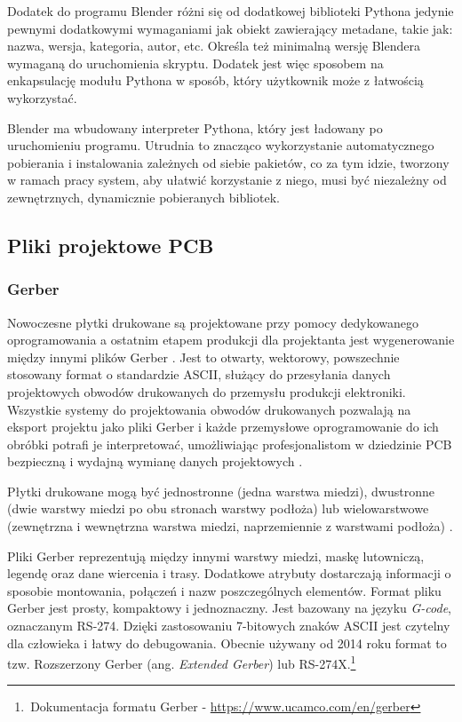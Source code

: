 \documentclass[brudnopis]{xmgr}
\begin{document}
Dodatek do programu Blender różni się od dodatkowej biblioteki Pythona jedynie pewnymi dodatkowymi wymaganiami jak obiekt zawierający metadane, takie jak: nazwa, wersja, kategoria, autor, etc. Określa też minimalną wersję Blendera wymaganą do uruchomienia skryptu. Dodatek jest więc sposobem na enkapsulację modułu Pythona w sposób, który użytkownik może z łatwością wykorzystać.

Blender ma wbudowany interpreter Pythona, który jest ładowany po uruchomieniu programu. Utrudnia to znacząco wykorzystanie automatycznego pobierania i instalowania zależnych od siebie pakietów, co za tym idzie, tworzony w ramach pracy system, aby ułatwić korzystanie z niego, musi być niezależny od zewnętrznych, dynamicznie pobieranych bibliotek.


\subsection{Pliki projektowe PCB}

\subsubsection {Gerber}
Nowoczesne płytki drukowane są projektowane przy pomocy dedykowanego oprogramowania a ostatnim etapem produkcji dla projektanta jest wygenerowanie między innymi plików Gerber \cite{Khandpur}.
Jest to otwarty, wektorowy, powszechnie stosowany format o standardzie ASCII, służący do przesyłania danych projektowych obwodów drukowanych do przemysłu produkcji elektroniki. Wszystkie systemy do projektowania obwodów drukowanych pozwalają na eksport projektu jako pliki Gerber i każde przemysłowe oprogramowanie do ich obróbki potrafi je interpretować, umożliwiając profesjonalistom w dziedzinie PCB bezpieczną i wydajną wymianę danych projektowych \cite{Williams}.

Płytki drukowane mogą być jednostronne (jedna warstwa miedzi), dwustronne (dwie warstwy miedzi po obu stronach warstwy podłoża) lub wielowarstwowe (zewnętrzna i wewnętrzna warstwa miedzi, naprzemiennie z warstwami podłoża) \cite{schroeder}.

Pliki Gerber reprezentują między innymi warstwy miedzi, maskę lutowniczą, legendę oraz dane wiercenia i trasy. Dodatkowe atrybuty dostarczają informacji o sposobie montowania, połączeń i nazw poszczególnych elementów. Format pliku Gerber jest prosty, kompaktowy i jednoznaczny. Jest bazowany na języku \emph{G-code}, oznaczanym RS-274. Dzięki zastosowaniu 7-bitowych znaków ASCII jest czytelny dla człowieka i łatwy do debugowania. Obecnie używany od 2014 roku format to tzw. Rozszerzony Gerber (ang. \emph{Extended Gerber}) lub RS-274X.\footnote{\,Dokumentacja formatu Gerber - \url{https://www.ucamco.com/en/gerber}}
\end{document}
